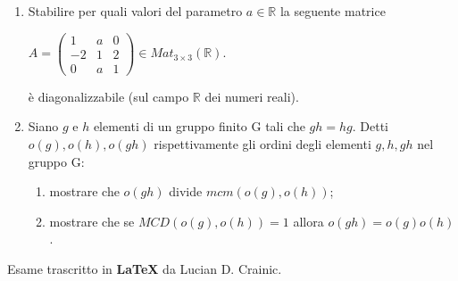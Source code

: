 \documentclass[fleqn]{article}
\begin{document}
\begin{enumerate}
   \item Stabilire per quali valori del parametro $a \in \mathbb{R}$ la seguente matrice 
   \begin{center}
    $
    A = \begin{pmatrix}
       1 & a & 0 \\
       -2 & 1 & 2 \\
       0 & a & 1
    \end{pmatrix}
    \in Mat_{3 \times 3}( \mathbb{R}).
    $ 
    \end{center}
      è diagonalizzabile (sul campo $\mathbb{R}$ dei numeri reali).
   
   \item Siano $g$ e $h$ elementi di un gruppo finito G tali che $gh = hg$. Detti $o(g), o(h), o(gh)$ rispettivamente
   gli ordini degli elementi $g, h, gh$ nel gruppo G:
    \begin{enumerate}
      \item mostrare che $o(gh)$ divide $mcm(o(g), o(h))$;
      \item mostrare che se $MCD(o(g), o(h)) = 1$ allora $o(gh) = o(g)o(h)$.
    \end{enumerate}
\end{enumerate}
Esame trascritto in \textbf{\LaTeX} da Lucian D. Crainic.
\end{document}

